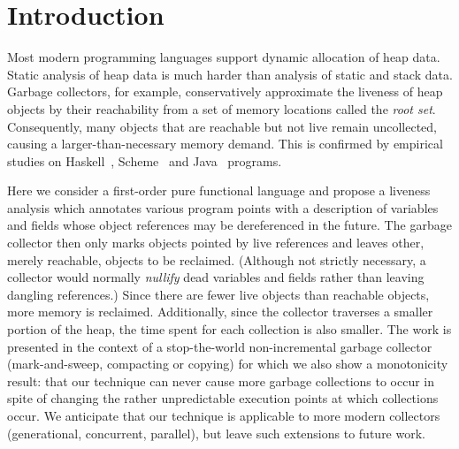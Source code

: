 \section{Introduction}
\label{sec:intro}

Most modern  programming languages support dynamic  allocation of heap
data.  Static  analysis of heap data  is much harder  than analysis of
static   and   stack   data.    Garbage   collectors,   for   example,
conservatively  approximate  the liveness  of  heap  objects by  their
reachability  from a  set of  memory  locations called  the {\em  root
  set\/}.  Consequently, many objects  that are reachable but not live
remain  uncollected, causing  a  larger-than-necessary memory  demand.
This is confirmed  by empirical studies on Haskell~\cite{rojemo96lag},
Scheme~\cite{karkare06effectiveness}                                and
Java~\cite{shaham02estimating} programs.

Here we consider a first-order  pure functional language and propose a
liveness  analysis  which  annotates  various program  points  with  a
description  of variables and  fields whose  object references  may be
dereferenced  in the future.   The garbage  collector then  only marks
objects pointed by live references and leaves other, merely reachable,
objects  to  be  reclaimed.    (Although  not  strictly  necessary,  a
collector  would  normally {\em  nullify}  dead  variables and  fields
rather than leaving dangling  references.)  Since there are fewer live
objects   than   reachable   objects,   more  memory   is   reclaimed.
Additionally, since  the collector traverses a smaller  portion of the
heap, the time spent for each collection is also smaller.  The work is
presented in  the context of a  stop-the-world non-incremental garbage
collector (mark-and-sweep,  compacting or  copying) for which  we also
show a  monotonicity result: that  our technique can never  cause more
garbage  collections  to  occur   in  spite  of  changing  the  rather
unpredictable  execution  points   at  which  collections  occur.   We
anticipate that our technique  is applicable to more modern collectors
(generational,  concurrent, parallel),  but leave  such  extensions to
future work.

